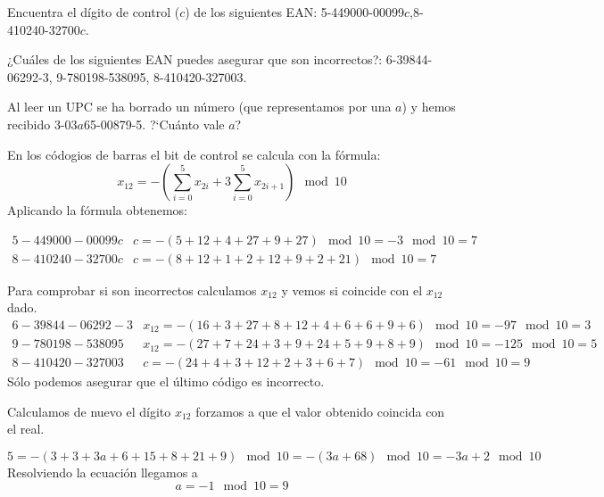 \begin{problem}[1]
\ppart Encuentra el dígito de control ($c$) de los
siguientes EAN:
 5-449000-00099$c$,8-410240-32700$c$.

\ppart ¿Cuáles de los siguientes EAN puedes asegurar que son
incorrectos?: 6-39844-06292-3, 9-780198-538095, 8-410420-327003.

\ppart  Al leer un UPC se ha borrado un número (que representamos por
una $a$) y hemos recibido 3-03$a$65-00879-5. ?`Cuánto vale $a$?
\solution
{}

\spart

En los códogios de barras el bit de control se calcula con la fórmula:
\[x_{12} = -\left(\sum_{i=0}^5x_{2i} + 3 \sum_{i=0}^5x_{2i+1} \right)\mod 10\]
Aplicando la fórmula obtenemos:

\[\begin{array}{ll}
5-449000-00099c & c= -(5+12+4+27+9+27)  \mod 10 = -3 \mod 10 = 7\\
8-410240-32700c & c= -(8+12+1+2+12+9+2+21) \mod 10 = 7
\end{array}\]

\spart

Para comprobar si son incorrectos calculamos $x_{12}$ y vemos si coincide con el $x_{12}$ dado.
\small
\[\begin{array}{ll}
6-39844-06292-3 & x_{12} = -(16+3+27+8+12+4+6+6+9+6)  \mod 10 = -97 \mod 10 = 3\\
9-780198-538095 & x_{12} = -(27+7+24+3+9+24+5+9+8+9) \mod 10 = -125 \mod 10 = 5 \\
8-410420-327003 & c = -(24+4+3+12+2+3+6+7) \mod 10 = -61 \mod 10 = 9
\end{array}\]
\normalsize
Sólo podemos asegurar que el último código es incorrecto.

\spart

Calculamos de nuevo el dígito $x_{12}$ forzamos a que el valor obtenido coincida con el real.

\[5 = -(3+3+3a+6+15+8+21+9)\mod 10 = -(3a+68) \mod 10 = -3a+2 \mod 10\]
Resolviendo la ecuación llegamos a
\[ a=-1 \mod 10 = 9\]


\end{problem}

